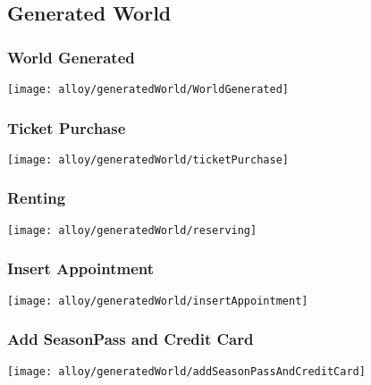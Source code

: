 \begin{landscape}
	\subsection{Generated World}
	
		\subsubsection{World Generated}
			\texttt{[image: alloy/generatedWorld/WorldGenerated]}
	
		\subsubsection{Ticket Purchase}
			\texttt{[image: alloy/generatedWorld/ticketPurchase]}
	
		\subsubsection{Renting}
			\texttt{[image: alloy/generatedWorld/reserving]}
		
		\subsubsection{Insert Appointment}
			\texttt{[image: alloy/generatedWorld/insertAppointment]}
			
		\subsubsection{Add SeasonPass and Credit Card}
			\texttt{[image: alloy/generatedWorld/addSeasonPassAndCreditCard]}

\end{landscape}
	
	
